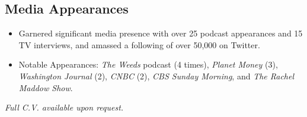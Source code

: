 \documentclass[11pt,]{article}
\providecommand{\tightlist}{%
  \setlength{\itemsep}{0pt}\setlength{\parskip}{0pt}}
\begin{document}
\subsection{Media Appearances}\label{media-appearances}

\begin{itemize}
\tightlist
\item
  Garnered significant media presence with over 25 podcast appearances
  and 15 TV interviews, and amassed a following of over 50,000 on
  Twitter.
\item
  Notable Appearances: \emph{The Weeds} podcast (4 times), \emph{Planet
  Money} (3), \emph{Washington Journal} (2), \emph{CNBC} (2), \emph{CBS
  Sunday Morning}, and \emph{The Rachel Maddow Show}.
\end{itemize}

\emph{Full C.V. available upon request.}
\end{document}
